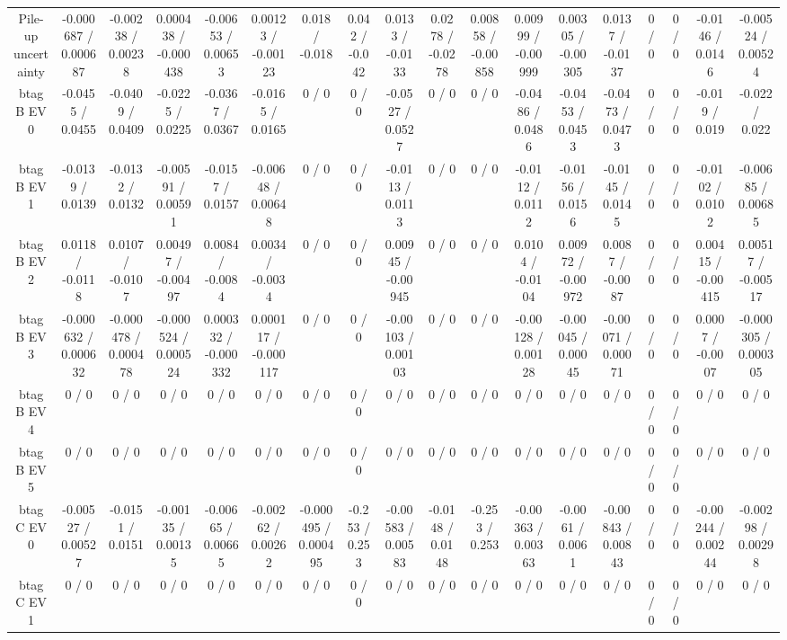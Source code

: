 \documentclass[10pt]{article}
\begin{document}
\begin{table}[htbp]
\begin{center}
\begin{tabular}{|c|c|c|c|c|c|c|c|c|c|c|c|c|c|c|c|c|c|}
  Pile-up uncertainty & -0.000687 / 0.000687 & -0.00238 / 0.00238 & 0.000438 / -0.000438 & -0.00653 / 0.00653 & 0.00123 / -0.00123 & 0.018 / -0.018 & 0.042 / -0.042 & 0.0133 / -0.0133 & 0.0278 / -0.0278 & 0.00858 / -0.00858 & 0.00999 / -0.00999 & 0.00305 / -0.00305 & 0.0137 / -0.0137 & 0 / 0 & 0 / 0 & -0.0146 / 0.0146 & -0.00524 / 0.00524 \\ 
  btag B EV 0 & -0.0455 / 0.0455 & -0.0409 / 0.0409 & -0.0225 / 0.0225 & -0.0367 / 0.0367 & -0.0165 / 0.0165 & 0 / 0 & 0 / 0 & -0.0527 / 0.0527 & 0 / 0 & 0 / 0 & -0.0486 / 0.0486 & -0.0453 / 0.0453 & -0.0473 / 0.0473 & 0 / 0 & 0 / 0 & -0.019 / 0.019 & -0.022 / 0.022 \\ 
  btag B EV 1 & -0.0139 / 0.0139 & -0.0132 / 0.0132 & -0.00591 / 0.00591 & -0.0157 / 0.0157 & -0.00648 / 0.00648 & 0 / 0 & 0 / 0 & -0.0113 / 0.0113 & 0 / 0 & 0 / 0 & -0.0112 / 0.0112 & -0.0156 / 0.0156 & -0.0145 / 0.0145 & 0 / 0 & 0 / 0 & -0.0102 / 0.0102 & -0.00685 / 0.00685 \\ 
  btag B EV 2 & 0.0118 / -0.0118 & 0.0107 / -0.0107 & 0.00497 / -0.00497 & 0.0084 / -0.0084 & 0.0034 / -0.0034 & 0 / 0 & 0 / 0 & 0.00945 / -0.00945 & 0 / 0 & 0 / 0 & 0.0104 / -0.0104 & 0.00972 / -0.00972 & 0.0087 / -0.0087 & 0 / 0 & 0 / 0 & 0.00415 / -0.00415 & 0.00517 / -0.00517 \\ 
  btag B EV 3 & -0.000632 / 0.000632 & -0.000478 / 0.000478 & -0.000524 / 0.000524 & 0.000332 / -0.000332 & 0.000117 / -0.000117 & 0 / 0 & 0 / 0 & -0.00103 / 0.00103 & 0 / 0 & 0 / 0 & -0.00128 / 0.00128 & -0.00045 / 0.00045 & -0.00071 / 0.00071 & 0 / 0 & 0 / 0 & 0.0007 / -0.0007 & -0.000305 / 0.000305 \\ 
  btag B EV 4 & 0 / 0 & 0 / 0 & 0 / 0 & 0 / 0 & 0 / 0 & 0 / 0 & 0 / 0 & 0 / 0 & 0 / 0 & 0 / 0 & 0 / 0 & 0 / 0 & 0 / 0 & 0 / 0 & 0 / 0 & 0 / 0 & 0 / 0 \\ 
  btag B EV 5 & 0 / 0 & 0 / 0 & 0 / 0 & 0 / 0 & 0 / 0 & 0 / 0 & 0 / 0 & 0 / 0 & 0 / 0 & 0 / 0 & 0 / 0 & 0 / 0 & 0 / 0 & 0 / 0 & 0 / 0 & 0 / 0 & 0 / 0 \\ 
  btag C EV 0 & -0.00527 / 0.00527 & -0.0151 / 0.0151 & -0.00135 / 0.00135 & -0.00665 / 0.00665 & -0.00262 / 0.00262 & -0.000495 / 0.000495 & -0.253 / 0.253 & -0.00583 / 0.00583 & -0.0148 / 0.0148 & -0.253 / 0.253 & -0.00363 / 0.00363 & -0.0061 / 0.0061 & -0.00843 / 0.00843 & 0 / 0 & 0 / 0 & -0.00244 / 0.00244 & -0.00298 / 0.00298 \\ 
  btag C EV 1 & 0 / 0 & 0 / 0 & 0 / 0 & 0 / 0 & 0 / 0 & 0 / 0 & 0 / 0 & 0 / 0 & 0 / 0 & 0 / 0 & 0 / 0 & 0 / 0 & 0 / 0 & 0 / 0 & 0 / 0 & 0 / 0 & 0 / 0 \\ 

\end{tabular}
\end{center}
\end{table}
\end{document}
